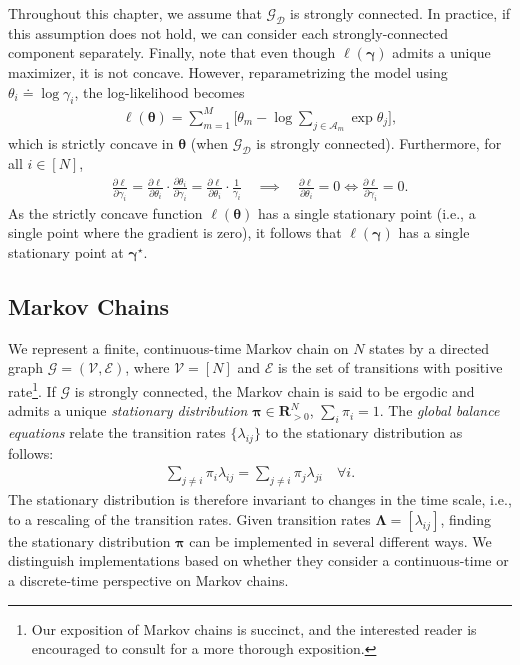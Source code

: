 Throughout this chapter, we assume that $\mathcal{G}_{\mathcal{D}}$ is strongly connected.
In practice, if this assumption does not hold, we can consider each strongly-connected component separately.
Finally, note that even though $\ell(\bm{\gamma})$ admits a unique maximizer, it is not concave.
However, reparametrizing the model using $\theta_i \doteq \log \gamma_i$, the log-likelihood becomes
\begin{align*}
\ell(\bm{\theta}) = \sum_{m = 1}^M \bigg[ \theta_m - \log{\sum_{j \in \mathcal{A}_m} \exp \theta_j} \bigg],
\end{align*}
which is strictly concave in $\bm{\theta}$ (when $\mathcal{G}_{\mathcal{D}}$ is strongly connected).
Furthermore, for all $i \in [N]$,
\begin{align*}
\frac{\partial \ell}{\partial \gamma_i}
  = \frac{\partial \ell}{\partial \theta_i} \cdot \frac{\partial \theta_i}{\partial \gamma_i}
  = \frac{\partial \ell}{\partial \theta_i} \cdot \frac{1}{\gamma_i}
\quad \implies \quad
\frac{\partial \ell}{\partial \theta_i} = 0 \iff \frac{\partial \ell}{\partial \gamma_i} = 0.
\end{align*}
As the strictly concave function $\ell({\bm{\theta}})$ has a single stationary point (i.e., a single point where the gradient is zero), it follows that $\ell(\bm{\gamma})$ has a single stationary point at $\bm{\gamma}^\star$.


\subsection{Markov Chains}

We represent a finite, continuous-time Markov chain on $N$ states by a directed graph $\mathcal{G} = (\mathcal{V}, \mathcal{E})$, where $\mathcal{V} = [N]$ and $\mathcal{E}$ is the set of transitions with positive rate\footnote{%
Our exposition of Markov chains is succinct, and the interested reader is encouraged to consult \citet{levin2008markov} for a more thorough exposition.}.
If $\mathcal{G}$ is strongly connected, the Markov chain is said to be ergodic and admits a unique \emph{stationary distribution} $\bm{\pi} \in \mathbf{R}^N_{>0}$, $\sum_i \pi_i = 1$.
The \emph{global balance equations} relate the transition rates $\{ \lambda_{ij} \}$ to the stationary distribution as follows:
\begin{align}
\label{fi:eq:balance}
\sum_{j \ne i} \pi_i \lambda_{ij} = \sum_{j \ne i} \pi_j \lambda_{ji} \quad \forall i.
\end{align}
The stationary distribution is therefore invariant to changes in the time scale, i.e., to a rescaling of the transition rates.
Given transition rates $\bm{\Lambda} = [\lambda_{ij}]$, finding the stationary distribution $\bm{\pi}$ can be implemented in several different ways.
We distinguish implementations based on whether they consider a continuous-time or a discrete-time perspective on Markov chains.

